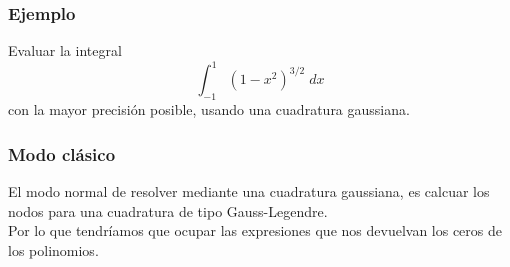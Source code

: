 \begin{frame}
\frametitle{Ejemplo}
Evaluar la integral
\[ \int_{-1}^{1} (1 - x^{2})^{3/2} \; dx \]
con la mayor precisión posible, usando una cuadratura gaussiana.
\end{frame}
\begin{frame}
\frametitle{Modo clásico}
El modo normal de resolver mediante una cuadratura gaussiana, es calcuar los nodos para una cuadratura de tipo Gauss-Legendre.
\\
\bigskip
Por lo que tendríamos que ocupar las expresiones que nos devuelvan los ceros de los polinomios. 
\end{frame}
